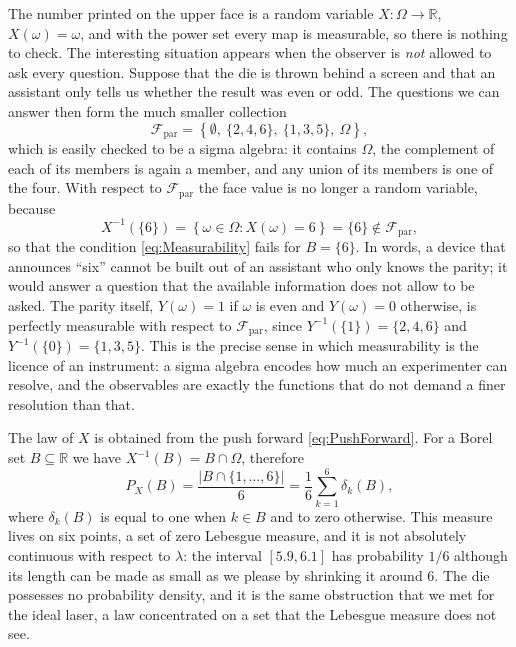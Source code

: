 		The number printed on the upper face is a random variable $X:\Omega\to\mathbb{R}$,
		$X(\omega) = \omega$, and with the power set every map is measurable, so there is
		nothing to check. The interesting situation appears when the observer is \textit{not}
		allowed to ask every question. Suppose that the die is thrown behind a screen and that
		an assistant only tells us whether the result was even or odd. The questions we can
		answer then form the much smaller collection
		\begin{equation}\label{eq:DieParity}
			\mathcal{F}_{\text{par}} = \left\{\emptyset,\ \{2,4,6\},\ \{1,3,5\},\ \Omega\right\},
		\end{equation}
		which is easily checked to be a sigma algebra: it contains $\Omega$, the complement of
		each of its members is again a member, and any union of its members is one of the four.
		With respect to $\mathcal{F}_{\text{par}}$ the face value is no longer a random variable,
		because
		\begin{equation*}
			X^{-1}\left(\{6\}\right) = \left\{\omega\in\Omega : X(\omega) = 6\right\} = \{6\}
			\notin\mathcal{F}_{\text{par}},
		\end{equation*}
		so that the condition \eqref{eq:Measurability} fails for $B=\{6\}$. In words, a
		device that announces ``six'' cannot be built out of an assistant who only knows the
		parity; it would answer a question that the available information does not allow to be
		asked. The parity itself, $Y(\omega) = 1$ if $\omega$ is even and $Y(\omega)=0$
		otherwise, is perfectly measurable with respect to $\mathcal{F}_{\text{par}}$, since
		$Y^{-1}(\{1\}) = \{2,4,6\}$ and $Y^{-1}(\{0\}) = \{1,3,5\}$. This is the precise sense
		in which measurability is the licence of an instrument: a sigma algebra encodes how much
		an experimenter can resolve, and the observables are exactly the functions that do not
		demand a finer resolution than that.

		The law of $X$ is obtained from the push forward \eqref{eq:PushForward}. For a Borel set
		$B\subseteq\mathbb{R}$ we have $X^{-1}(B) = B\cap\Omega$, therefore
		\begin{equation}\label{eq:DieLaw}
			P_{X}(B) = \frac{\left|B\cap\{1,\dots,6\}\right|}{6}
			= \frac{1}{6}\sum_{k=1}^{6}\delta_{k}(B),
		\end{equation}
		where $\delta_{k}(B)$ is equal to one when $k\in B$ and to zero otherwise. This measure
		lives on six points, a set of zero Lebesgue measure, and it is not absolutely
		continuous with respect to $\lambda$: the interval $[5.9,6.1]$ has probability $1/6$
		although its length can be made as small as we please by shrinking it around $6$. The
		die possesses no probability density, and it is the same obstruction that we met for
		the ideal laser, a law concentrated on a set that the Lebesgue measure does not see.

